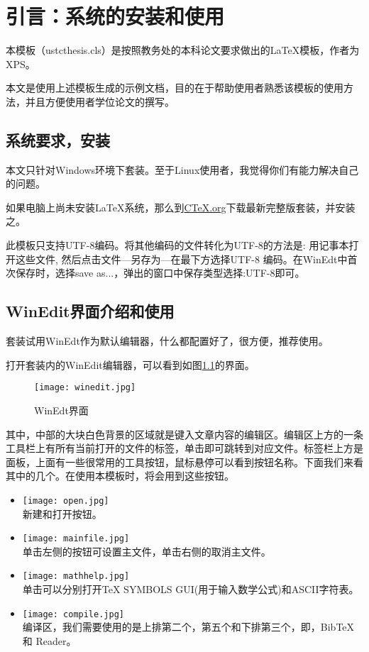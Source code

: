 ﻿
\chapter{引言：\CTeX 系统的安装和使用}
\label{chap:introduction}

本模板（ustcthesis.cls）是按照教务处的本科论文要求做出的\LaTeX 模板，作者为XPS。\par
本文是使用上述模板生成的示例文档，目的在于帮助使用者熟悉该模板的使用方法，并且方便使用者学位论文的撰写。

\section{系统要求，\CTeX 安装}
本文只针对Windows环境下\CTeX 套装。至于Linux使用者，我觉得你们有能力解决自己的问题。\par
如果电脑上尚未安装\LaTeX 系统，那么到\href{http://www.ctex.org/}{CTeX.org}下载最新完整版\CTeX 套装，并安装之。\par
此模板只支持UTF-8编码。将其他编码的文件转化为UTF-8的方法是: 用记事本打开这些文件, 然后点击文件—另存为—在最下方选择UTF-8 编码。在WinEdt中首次保存时，选择save as...，弹出的窗口中保存类型选择:UTF-8即可。


\section{WinEdit界面介绍和使用}
\CTeX 套装试用WinEdt作为默认编辑器，什么都配置好了，很方便，推荐使用。

打开\CTeX 套装内的WinEdit编辑器，可以看到如图\ref{f:winedit}的界面。
\begin{figure}[ht]
\centering
\texttt{[image: winedit.jpg]}
\caption{WinEdt界面}
\label{f:winedit}
\end{figure}

其中，中部的大块白色背景的区域就是键入文章内容的编辑区。编辑区上方的一条工具栏上有所有当前打开的文件的标签，单击即可跳转到对应文件。标签栏上方是面板，上面有一些很常用的工具按钮，鼠标悬停可以看到按钮名称。下面我们来看其中的几个。在使用本模板时，将会用到这些按钮。
\begin{itemize}
\item \texttt{[image: open.jpg]}\\
新建和打开按钮。
\item \texttt{[image: mainfile.jpg]}\\
单击左侧的按钮可设置主文件，单击右侧的取消主文件。
\item \texttt{[image: mathhelp.jpg]}\\
单击可以分别打开TeX SYMBOLS GUI(用于输入数学公式)和ASCII字符表。
\item \texttt{[image: compile.jpg]}\\
编译区，我们需要使用的是上排第二个，第五个和下排第三个，即\XeLaTeX ，BibTeX和 Reader。
\end{itemize}

